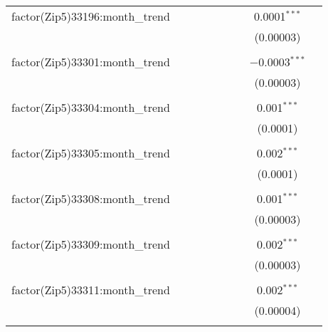 \begin{table}[H]
{\begin{tabular}{@{\extracolsep{5pt}}lcccccccc}
  factor(Zip5)33196:month\_trend &  &  &  &  &  &  & 0.0001$^{***}$ &  \\  

   &  &  &  &  &  &  & (0.00003) &  \\  

   & & & & & & & & \\  

  factor(Zip5)33301:month\_trend &  &  &  &  &  &  & $-$0.0003$^{***}$ &  \\  

   &  &  &  &  &  &  & (0.00003) &  \\  

   & & & & & & & & \\  

  factor(Zip5)33304:month\_trend &  &  &  &  &  &  & 0.001$^{***}$ &  \\  

   &  &  &  &  &  &  & (0.0001) &  \\  

   & & & & & & & & \\  

  factor(Zip5)33305:month\_trend &  &  &  &  &  &  & 0.002$^{***}$ &  \\  

   &  &  &  &  &  &  & (0.0001) &  \\  

   & & & & & & & & \\  

  factor(Zip5)33308:month\_trend &  &  &  &  &  &  & 0.001$^{***}$ &  \\  

   &  &  &  &  &  &  & (0.00003) &  \\  

   & & & & & & & & \\  

  factor(Zip5)33309:month\_trend &  &  &  &  &  &  & 0.002$^{***}$ &  \\  

   &  &  &  &  &  &  & (0.00003) &  \\  

   & & & & & & & & \\  

  factor(Zip5)33311:month\_trend &  &  &  &  &  &  & 0.002$^{***}$ &  \\  

   &  &  &  &  &  &  & (0.00004) &  \\  

   & & & & & & & & \\  


\end{tabular}}
\end{table}
